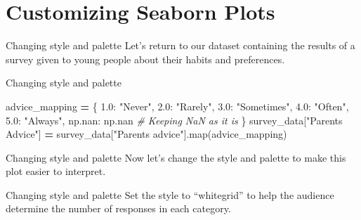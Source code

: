 \documentclass[
  ignorenonframetext,
]{beamer}
\newenvironment{Shaded}{\begin{snugshade}}{\end{snugshade}}
\newcommand{\BuiltInTok}[1]{#1}
\newcommand{\CommentTok}[1]{\textcolor[rgb]{0.56,0.35,0.01}{\textit{#1}}}
\newcommand{\FloatTok}[1]{\textcolor[rgb]{0.00,0.00,0.81}{#1}}
\newcommand{\NormalTok}[1]{#1}
\newcommand{\OperatorTok}[1]{\textcolor[rgb]{0.81,0.36,0.00}{\textbf{#1}}}
\newcommand{\StringTok}[1]{\textcolor[rgb]{0.31,0.60,0.02}{#1}}
\begin{document}
\section{Customizing Seaborn Plots}\label{customizing-seaborn-plots}

\begin{frame}{Changing style and palette}
\label{changing-style-and-palette}
Let's return to our dataset containing the results of a survey given to
young people about their habits and preferences.
\end{frame}

\begin{frame}[fragile]{Changing style and palette}
\label{changing-style-and-palette-1}

\begin{Shaded}
\begin{Highlighting}[]
\NormalTok{advice\_mapping }\OperatorTok{=}\NormalTok{ \{}
    \FloatTok{1.0}\NormalTok{: }\StringTok{"Never"}\NormalTok{,}
    \FloatTok{2.0}\NormalTok{: }\StringTok{"Rarely"}\NormalTok{,}
    \FloatTok{3.0}\NormalTok{: }\StringTok{"Sometimes"}\NormalTok{,}
    \FloatTok{4.0}\NormalTok{: }\StringTok{"Often"}\NormalTok{,}
    \FloatTok{5.0}\NormalTok{: }\StringTok{"Always"}\NormalTok{,}
\NormalTok{    np.nan: np.nan  }\CommentTok{\# Keeping NaN as it is}
\NormalTok{\}}
\NormalTok{survey\_data[}\StringTok{"Parents Advice"}\NormalTok{] }\OperatorTok{=}\NormalTok{ survey\_data[}\StringTok{"Parents\textquotesingle{} advice"}\NormalTok{].}\BuiltInTok{map}\NormalTok{(advice\_mapping)}
\end{Highlighting}
\end{Shaded}
\end{frame}

\begin{frame}{Changing style and palette}
\label{changing-style-and-palette-2}
Now let's change the style and palette to make this plot easier to
interpret.
\end{frame}

\begin{frame}{Changing style and palette}
\label{changing-style-and-palette-3}
Set the style to ``whitegrid'' to help the audience determine the number
of responses in each category.
\end{frame}
\end{document}
